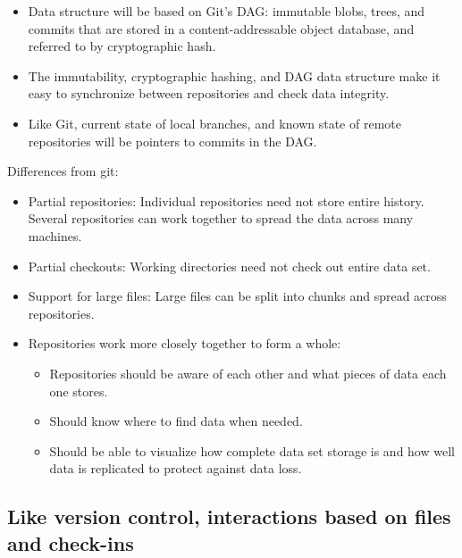 \documentclass[a4paper]{article}
\begin{document}
\begin{itemize}
\item
  Data structure will be based on Git's DAG: immutable blobs, trees, and commits
  that are stored in a content-addressable object database, and referred to by
  cryptographic hash.
\item
  The immutability, cryptographic hashing, and DAG data structure make it easy
  to synchronize between repositories and check data integrity.
\item
  Like Git, current state of local branches, and known state of remote
  repositories will be pointers to commits in the DAG.
\end{itemize}

Differences from git:

\begin{itemize}
\item
  Partial repositories: Individual repositories need not store entire
  history. Several repositories can work together to spread the data
  across many machines.
\item
  Partial checkouts: Working directories need not check out entire data
  set.
\item
  Support for large files: Large files can be split into chunks and
  spread across repositories.
\item
  Repositories work more closely together to form a whole:

  \begin{itemize}
  \item
    Repositories should be aware of each other and what pieces of data
    each one stores.
  \item
    Should know where to find data when needed.
  \item
    Should be able to visualize how complete data set storage is and how
    well data is replicated to protect against data loss.
  \end{itemize}
\end{itemize}


\subsection{Like version control, interactions based on files and
check-ins}\label{like-version-control-interactions-based-on-files-and-check-ins}
\end{document}
